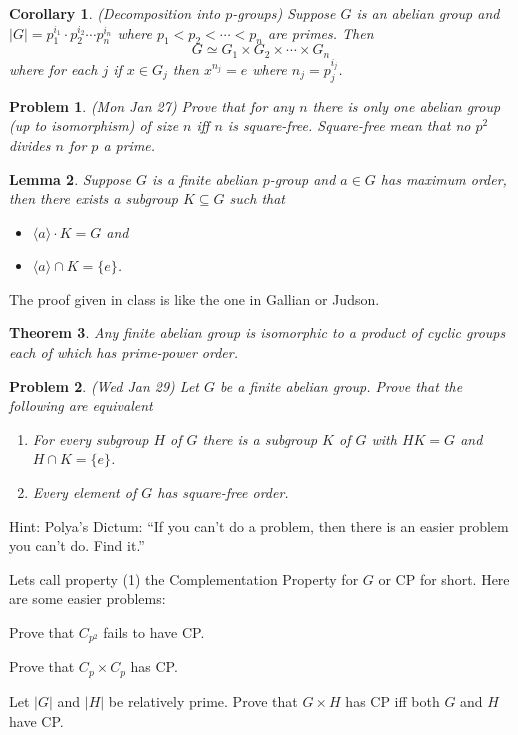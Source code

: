 \documentclass[12pt]{article}
\def\la{\lambda}
\def\isom{\simeq}
\def\su{\subseteq}
\def\ra{\rangle}
\def\la{\langle}
\newtheorem{theorem}{Theorem}
\newtheorem{lemma}[theorem]{Lemma}
\newtheorem{cor}[theorem]{Corollary}
\newtheorem{prob}{Problem}
\newenvironment{enum}
{\begin{list}{(\alph{enumi})}
{\usecounter{enumi}\setlength{\rightmargin}{\leftmargin}}}
{\end{list}}
\begin{document}
\begin{cor} (Decomposition into $p$-groups)
Suppose $G$ is an abelian group and $|G|=p_1^{i_1}\cdot p_2^{i_2}\cdots p_n^{i_n}$
where $p_1<p_2<\cdots <p_n$ are primes.  Then
$$G\isom G_1\times G_2\times\cdots\times G_n$$ 
where for each $j$ if $x\in G_j$ then $x^{n_j}=e$ where $n_j=p_j^{i_j}$.
\end{cor}

\begin{prob}
(Mon Jan 27) Prove that for any $n$ there is only one abelian group (up to 
isomorphism) of size $n$ iff $n$ is square-free.  Square-free
mean that no $p^2$ divides $n$ for $p$ a prime.
\end{prob}

\begin{lemma}
Suppose $G$ is a finite abelian $p$-group and $a\in G$ has maximum
order, then there exists a subgroup $K\su G$ such that
\begin{itemize}
\item $\la a\ra\cdot K=G$ and 
\item $\la a\ra\cap K=\{e\}$.
\end{itemize}
\end{lemma}

The proof given in class is like the one in Gallian or Judson.

\begin{theorem}
Any finite abelian group is isomorphic to a product of cyclic
groups each of which has prime-power order.
\end{theorem}

\begin{prob}(Wed Jan 29)
Let $G$ be a finite abelian group.  Prove that the following are equivalent
\begin{enumerate}
\item For every subgroup $H$ of $G$ there is a subgroup $K$ of $G$ with
$HK=G$ and $H\cap K=\{e\}$. 
\item Every  element of $G$ has square-free order.
\end{enumerate}
\end{prob}


Hint: Polya's Dictum: ``If you can't do a problem, then there is an
easier problem you can't do.  Find it.''

Lets call property (1) the Complementation Property for $G$
or CP for short.  Here are some easier problems:
\begin{enum}
\item Prove that $C_{p^2}$ fails to have CP.
\item Prove that $C_p\times C_p$ has CP.
\item Let $|G|$ and $|H|$ be
relatively prime.  Prove that $G\times H$ has CP iff both
$G$ and $H$ have CP.
\end{enum}
\end{document}
